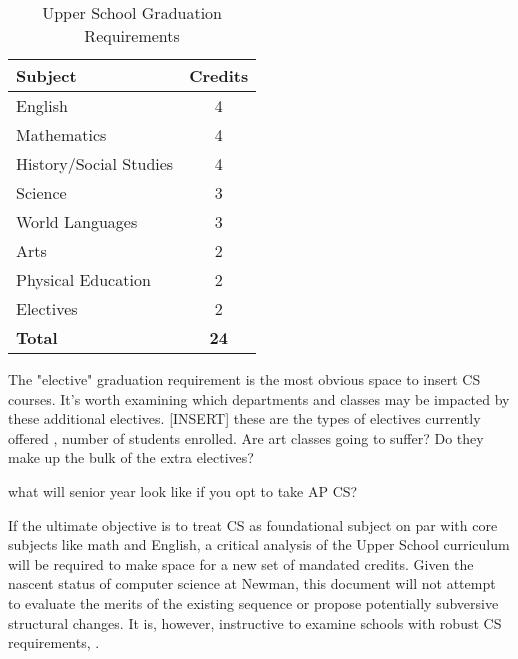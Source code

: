 \begin{table}
	\begin{center}
\begin{tabular}{ | l | c | }
	
	\hline
	\textbf{Subject} & \textbf{Credits} \\ \hline
	English & 4 \\ \hline
	Mathematics & 4 \\ \hline
	History/Social Studies & 4 \\ \hline
	Science & 3 \\ \hline
	World Languages & 3 \\ \hline
	Arts & 2 \\ \hline
	Physical Education & 2 \\ \hline
	Electives & 2 \\ \hline
	\textbf{Total} & \textbf{24} \\ \hline
\end{tabular} 
\caption{Upper School Graduation Requirements} \label{tab:usreqs} 
\end{center}
\end{table}
\par
The "elective" graduation requirement is the most obvious space to insert CS courses. It's worth examining which departments and classes may be impacted by these additional electives. [INSERT] these are the types of electives currently offered , number of students enrolled. Are art classes going to suffer? Do they make up the bulk of the extra electives? \par
what will senior year look like if you opt to take AP CS?\par
If the ultimate objective is to treat CS as foundational subject on par with core subjects like math and English, a critical analysis of the Upper School curriculum will be required to make space for a new set of mandated credits. Given the nascent status of computer science at Newman, this document will not attempt to evaluate the merits of the existing sequence or propose potentially subversive structural changes. It is, however, instructive to examine schools with robust CS requirements, .\par
  [insert schools with lots of cs] \par 

